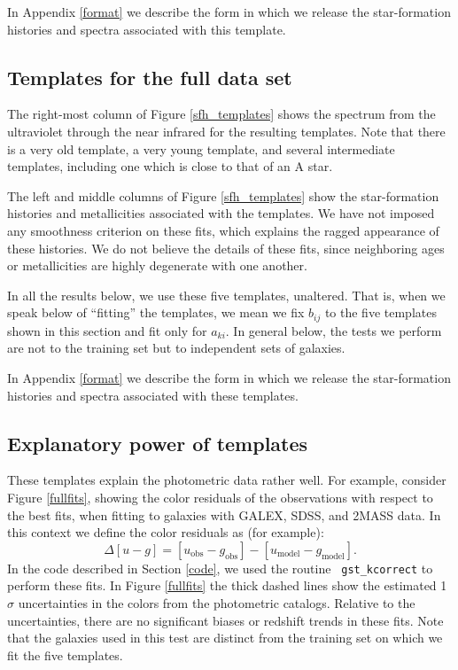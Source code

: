 \documentclass[10pt,preprint]{aastex}
\begin{document}
In Appendix \ref{format} we describe the form in which we release 
the star-formation histories and spectra associated with this
template.

\subsection{Templates for the full data set}

The right-most column of Figure \ref{sfh_templates} shows the spectrum
from the ultraviolet through the near infrared for the resulting
templates. Note that there is a very old template, a very young
template, and several intermediate templates, including one which is
close to that of an A star.

The left and middle columns of Figure \ref{sfh_templates} show the
star-formation histories and metallicities associated with the
templates. We have not imposed any smoothness criterion on these fits,
which explains the ragged appearance of these histories. We do not
believe the details of these fits, since neighboring ages or
metallicities are highly degenerate with one another.

In all the results below, we use these five templates, unaltered. That
is, when we speak below of ``fitting'' the templates, we mean we fix
$b_{ij}$ to the five templates shown in this section and fit only for
$a_{ki}$. In general below, the tests we perform are not to the
training set but to independent sets of galaxies.

In Appendix \ref{format} we describe the form in which we release the
star-formation histories and spectra associated with these templates.

\subsection{Explanatory power of templates}

These templates explain the photometric data rather well. For example,
consider Figure \ref{fullfits}, showing the color residuals of the
observations with respect to the best fits, when fitting to galaxies
with GALEX, SDSS, and 2MASS data. In this context we define the color
residuals as (for example):
\begin{equation}
\Delta [u-g] = [u_{\mathrm{obs}}- g_{\mathrm{obs}}] -
[u_{\mathrm{model}}- g_{\mathrm{model}}] .
\end{equation}
In the code described in Section \ref{code}, we used the routine {\tt
gst\_kcorrect} to perform these fits.  In Figure \ref{fullfits} the
thick dashed lines show the estimated 1$\sigma$ uncertainties in the
colors from the photometric catalogs. Relative to the uncertainties,
there are no significant biases or redshift trends in these fits. Note
that the galaxies used in this test are distinct from the training set
on which we fit the five templates.
\end{document}
